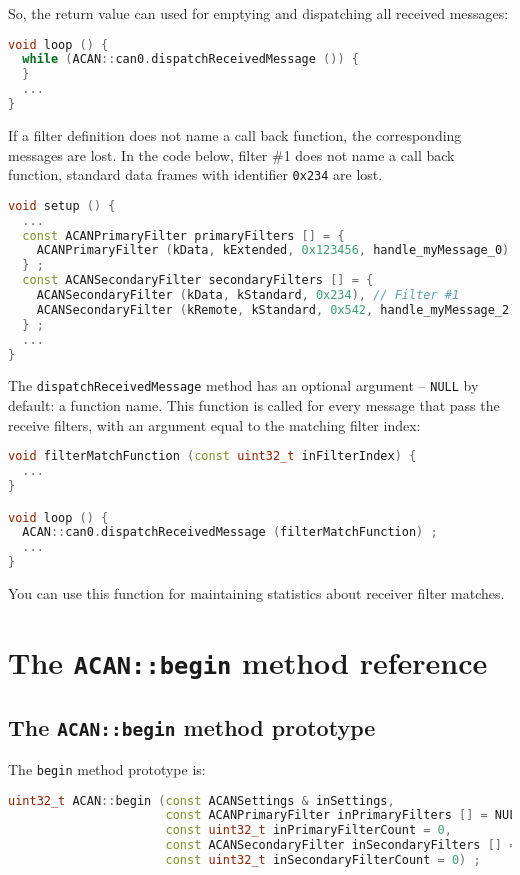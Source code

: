 \documentclass[10pt, a4paper, obeyspaces, openany]{extarticle}
\newcommand \sectionLabel[2]{\section{#1}\label{sec:#2}}
\begin{document}
So, the return value can used for emptying and dispatching all received messages:
{ \small\begin{lstlisting}[language=c++]
void loop () {
  while (ACAN::can0.dispatchReceivedMessage ()) {
  }
  ...
}
\end{lstlisting}}

If a filter definition does not name a call back function, the corresponding messages are lost. In the code below, filter \#1 does not name a call back function, standard data frames with identifier \texttt{0x234} are lost.

{ \small\begin{lstlisting}[language=c++]
void setup () {
  ...
  const ACANPrimaryFilter primaryFilters [] = {
    ACANPrimaryFilter (kData, kExtended, 0x123456, handle_myMessage_0)
  } ;
  const ACANSecondaryFilter secondaryFilters [] = {
    ACANSecondaryFilter (kData, kStandard, 0x234), // Filter #1
    ACANSecondaryFilter (kRemote, kStandard, 0x542, handle_myMessage_2)
  } ;
  ...
}
\end{lstlisting}}


The \texttt{dispatchReceivedMessage} method has an optional argument -- \texttt{NULL} by default: a function name. This function is called for every message that pass the receive filters, with an argument equal to the matching filter index:

{ \small\begin{lstlisting}[language=c++]
void filterMatchFunction (const uint32_t inFilterIndex) {
  ...
}

void loop () {
  ACAN::can0.dispatchReceivedMessage (filterMatchFunction) ;
  ...
}
\end{lstlisting}}

You can use this function for maintaining statistics about receiver filter matches.


\sectionLabel{The \texttt{ACAN::begin} method reference}{beginMethodReference}

\subsection{The \texttt{ACAN::begin} method prototype}

The \texttt{begin} method prototype is:
{ \small\begin{lstlisting}[language=c++]
uint32_t ACAN::begin (const ACANSettings & inSettings,
                      const ACANPrimaryFilter inPrimaryFilters [] = NULL,
                      const uint32_t inPrimaryFilterCount = 0,
                      const ACANSecondaryFilter inSecondaryFilters [] = NULL,
                      const uint32_t inSecondaryFilterCount = 0) ;
\end{lstlisting}}
\end{document}
